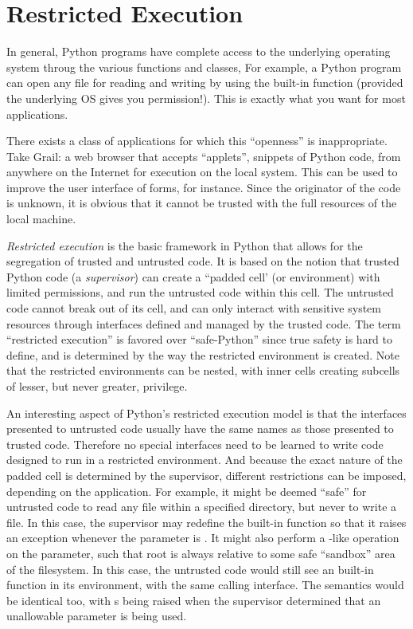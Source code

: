 \chapter{Restricted Execution}

In general, Python programs have complete access to the underlying
operating system throug the various functions and classes, For
example, a Python program can open any file for reading and writing by
using the  built-in function (provided the underlying OS
gives you permission!).  This is exactly what you want for most
applications.

There exists a class of applications for which this ``openness'' is
inappropriate.  Take Grail: a web browser that accepts ``applets'',
snippets of Python code, from anywhere on the Internet for execution
on the local system.  This can be used to improve the user interface
of forms, for instance.  Since the originator of the code is unknown,
it is obvious that it cannot be trusted with the full resources of the
local machine.

\emph{Restricted execution} is the basic framework in Python that allows
for the segregation of trusted and untrusted code.  It is based on the
notion that trusted Python code (a \emph{supervisor}) can create a
``padded cell' (or environment) with limited permissions, and run the
untrusted code within this cell.  The untrusted code cannot break out
of its cell, and can only interact with sensitive system resources
through interfaces defined and managed by the trusted code.  The term
``restricted execution'' is favored over ``safe-Python''
since true safety is hard to define, and is determined by the way the
restricted environment is created.  Note that the restricted
environments can be nested, with inner cells creating subcells of
lesser, but never greater, privilege.

An interesting aspect of Python's restricted execution model is that
the interfaces presented to untrusted code usually have the same names
as those presented to trusted code.  Therefore no special interfaces
need to be learned to write code designed to run in a restricted
environment.  And because the exact nature of the padded cell is
determined by the supervisor, different restrictions can be imposed,
depending on the application.  For example, it might be deemed
``safe'' for untrusted code to read any file within a specified
directory, but never to write a file.  In this case, the supervisor
may redefine the built-in
 function so that it raises an exception whenever the
 parameter is .  It might also perform a
-like operation on the  parameter, such
that root is always relative to some safe ``sandbox'' area of the
filesystem.  In this case, the untrusted code would still see an
built-in  function in its environment, with the same
calling interface.  The semantics would be identical too, with
s being raised when the supervisor determined that an
unallowable parameter is being used.

